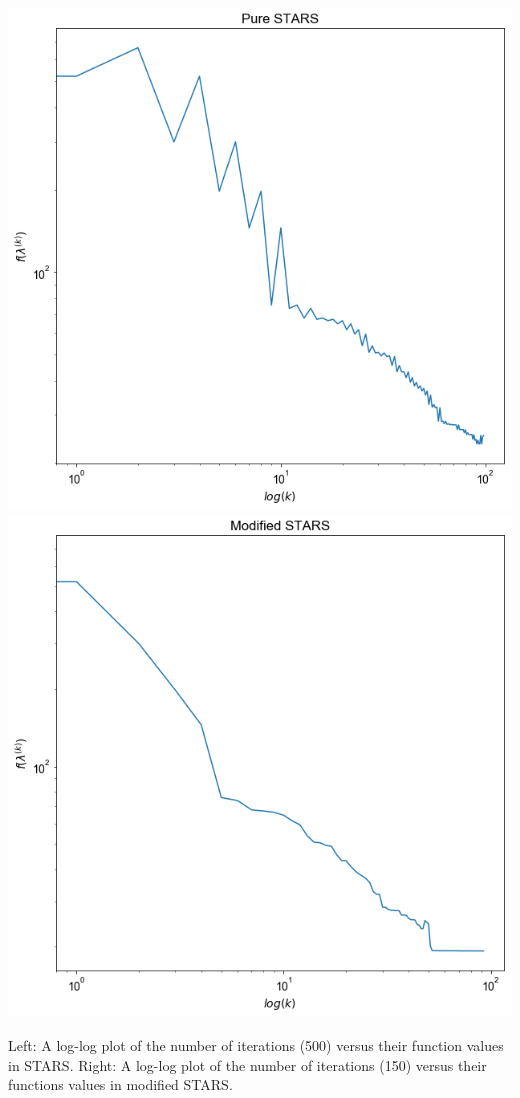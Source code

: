 \documentclass[11pt]{beamer}
\begin{document}
\begin{frame}


\begin{center}

 
\includegraphics[scale=0.25]{pure_stars_1.png} \includegraphics[scale=0.25]{mod_stars_1.png}

Left: A log-log plot of the number of iterations (500) versus their function values in STARS. Right: A log-log plot of the number of iterations (150) versus their functions values in modified STARS.

\end{center}


\end{frame}
\end{document}
